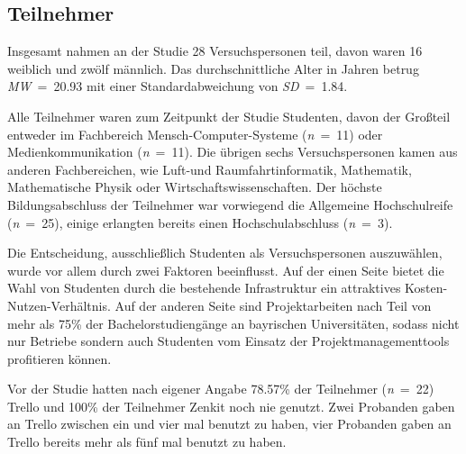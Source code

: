 \subsection{Teilnehmer}
Insgesamt nahmen an der Studie 28 Versuchspersonen teil, davon waren 16 weiblich und zwölf männlich. Das durchschnittliche Alter in Jahren betrug \textit{MW}~=~20.93 mit einer Standardabweichung von \textit{SD}~=~1.84.

Alle Teilnehmer waren zum Zeitpunkt der Studie Studenten, davon der Großteil entweder im Fachbereich Mensch-Computer-Systeme (\textit{n}~=~11) oder Medienkommunikation (\textit{n}~=~11). Die übrigen sechs Versuchspersonen kamen aus anderen Fachbereichen, wie Luft-und Raumfahrtinformatik, Mathematik, Mathematische Physik oder Wirtschaftswissenschaften. Der höchste Bildungsabschluss der Teilnehmer war vorwiegend die Allgemeine Hochschulreife (\textit{n}~=~25), einige erlangten bereits einen Hochschulabschluss (\textit{n}~=~3).

Die Entscheidung, ausschließlich Studenten als Versuchspersonen auszuwählen, wurde vor allem durch zwei Faktoren beeinflusst. Auf der einen Seite bietet die Wahl von Studenten durch die bestehende Infrastruktur ein attraktives Kosten-Nutzen-Verhältnis.
Auf der anderen Seite sind Projektarbeiten nach \cite{gensch2003bachelor} Teil von mehr als 75\% der  Bachelorstudiengänge an bayrischen Universitäten, sodass nicht nur Betriebe sondern auch Studenten vom Einsatz der Projektmanagementtools profitieren können.

Vor der Studie hatten nach eigener Angabe 78.57\% der Teilnehmer (\textit{n}~=~22) Trello und 100\% der Teilnehmer Zenkit noch nie genutzt. Zwei Probanden gaben an Trello zwischen ein und vier mal benutzt zu haben, vier Probanden gaben an Trello bereits mehr als fünf mal benutzt zu haben.
